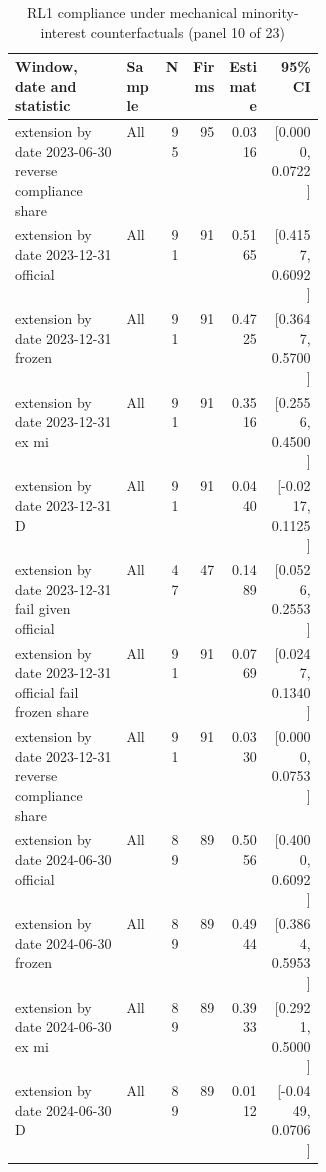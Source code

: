\begin{table}[!htbp]\centering\scriptsize
\caption{RL1 compliance under mechanical minority-interest counterfactuals (panel 10 of 23)}
\begin{threeparttable}
\begin{tabular}{p{0.36\linewidth}lrrrr}
\toprule
Window, date and statistic & Sample & N & Firms & Estimate & 95\% CI \\
\midrule
extension by date 2023-06-30 reverse compliance share & All & 95 & 95 & 0.0316 & [0.0000, 0.0722] \\
extension by date 2023-12-31 official & All & 91 & 91 & 0.5165 & [0.4157, 0.6092] \\
extension by date 2023-12-31 frozen & All & 91 & 91 & 0.4725 & [0.3647, 0.5700] \\
extension by date 2023-12-31 ex mi & All & 91 & 91 & 0.3516 & [0.2556, 0.4500] \\
extension by date 2023-12-31 D & All & 91 & 91 & 0.0440 & [-0.0217, 0.1125] \\
extension by date 2023-12-31 fail given official & All & 47 & 47 & 0.1489 & [0.0526, 0.2553] \\
extension by date 2023-12-31 official fail frozen share & All & 91 & 91 & 0.0769 & [0.0247, 0.1340] \\
extension by date 2023-12-31 reverse compliance share & All & 91 & 91 & 0.0330 & [0.0000, 0.0753] \\
extension by date 2024-06-30 official & All & 89 & 89 & 0.5056 & [0.4000, 0.6092] \\
extension by date 2024-06-30 frozen & All & 89 & 89 & 0.4944 & [0.3864, 0.5953] \\
extension by date 2024-06-30 ex mi & All & 89 & 89 & 0.3933 & [0.2921, 0.5000] \\
extension by date 2024-06-30 D & All & 89 & 89 & 0.0112 & [-0.0449, 0.0706] \\
\bottomrule
\end{tabular}
\begin{tablenotes}[flushleft]\footnotesize

\end{tablenotes}
\end{threeparttable}
\end{table}
